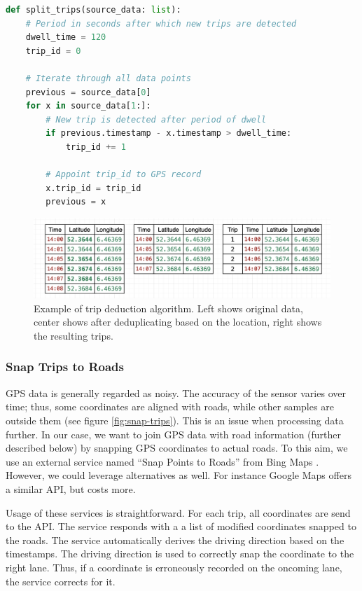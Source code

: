 \begin{lstlisting}[language=Python, caption={Psuedo implementation of splitting GPS data into trips.}, label={list:split-trips}]
def split_trips(source_data: list):
    # Period in seconds after which new trips are detected
    dwell_time = 120
    trip_id = 0

    # Iterate through all data points
    previous = source_data[0]
    for x in source_data[1:]:
        # New trip is detected after period of dwell
        if previous.timestamp - x.timestamp > dwell_time:
            trip_id += 1
        
        # Appoint trip_id to GPS record
        x.trip_id = trip_id
        previous = x
\end{lstlisting}


\begin{figure}[H]
  \centering
  \includegraphics[width=0.95\linewidth]{images/4_data/trip-detection.png}
  \captionsetup{width=.90\textwidth}
  \caption{Example of trip deduction algorithm. Left shows original data, center shows after deduplicating based on the location, right shows the resulting trips.}
  \label{fig:test2}
\end{figure}




\subsubsection{Snap Trips to Roads}
GPS data is generally regarded as noisy. The accuracy of the sensor varies over time; thus, some coordinates are aligned with roads, while other samples are outside them (see figure \ref{fig:snap-trips}). This is an issue when processing data further. In our case, we want to join GPS data with road information (further described below) by snapping GPS coordinates to actual roads. To this aim, we use an external service named ``Snap Points to Roads'' from Bing Maps \cite{Snap-Points-to-Roads}. However, we could leverage alternatives as well. For instance Google Maps offers a similar API, but costs more.

Usage of these services is straightforward. For each trip, all coordinates are send to the API. The service responds with a a list of modified coordinates snapped to the roads. The service automatically derives the driving direction based on the timestamps. The driving direction is used to correctly snap the coordinate to the right lane. Thus, if a coordinate is erroneously recorded on the oncoming lane, the service corrects for it.

